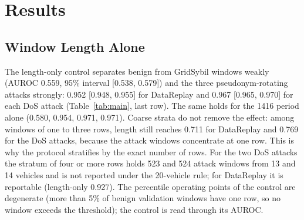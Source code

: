 \section{Results}\label{sec:results}


\subsection{Window Length Alone}\label{sec:res-length}

The length-only control separates benign from GridSybil windows weakly (AUROC 0.559, 95\% interval
[0.538, 0.579]) and the three pseudonym-rotating attacks strongly: 0.952 [0.948, 0.955] for DataReplay and 0.967
[0.965, 0.970] for each DoS attack (Table~\ref{tab:main}, last row). The same holds for the 1416 period alone
(0.580, 0.954, 0.971, 0.971). Coarse strata do not remove the effect: among windows of one to three rows,
length still reaches 0.711 for DataReplay and 0.769 for the DoS attacks, because the attack windows concentrate
at one row. This is why the protocol stratifies by the exact number of rows. For the two DoS attacks the stratum
of four or more rows holds 523 and 524 attack windows from 13 and 14 vehicles and is not reported under the
20-vehicle rule; for DataReplay it is reportable (length-only 0.927). The percentile operating points of the
control are degenerate (more than 5\% of benign validation windows have one row, so no window exceeds the
threshold); the control is read through its AUROC.

